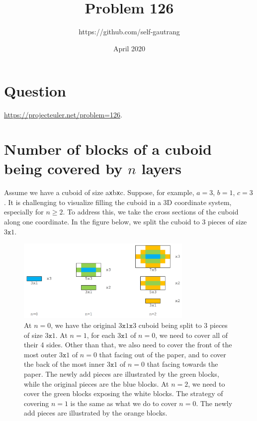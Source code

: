 \documentclass{article}
\title{Problem 126}
\author{https://github.com/self-gautrang}
\date{April 2020}
\begin{document}
\maketitle

\section{Question}
\href{https://projecteuler.net/problem=126}{https://projecteuler.net/problem=126}.

\section{Number of blocks of a cuboid being covered by $n$ layers}
\indent Assume we have a cuboid of size a\texttt{x}b\texttt{x}c. 
Suppose, for example, $a=3$, $b=1$, $c=3$.  
It is challenging to visualize filling the cuboid in a 3D coordinate system, especially for $n \geq 2$. 
To address this, we take the cross sections of the cuboid along one coordinate. 
In the figure below, we split the cuboid to 3 pieces of size $3 \texttt{x} 1$. \\
\begin{figure}[h]
  \centering
    \includegraphics[width=0.75\textwidth]{images/p126_1.png}
  \caption{At $n=0$, we have the original $3\texttt{x}1\texttt{x}3$ cuboid being split to 3 pieces of size $3 \texttt{x} 1$. 
  At $n=1$, for each $3 \texttt{x} 1$ of $n = 0$, we need to cover all of their 4 sides. 
  Other than that, we also need to cover the front of the most outer $3 \texttt{x} 1$ of $n = 0$ that facing out of the paper, and to cover the back of the most inner $3 \texttt{x} 1$ of $n = 0$ that facing towards the paper. 
  The newly add pieces are illustrated by the green blocks, while the original pieces are the blue blocks. 
  At $n=2$, we need to cover the green blocks exposing the white blocks. 
  The strategy of covering $n=1$ is the same as what we do to cover $n=0$. 
  The newly add pieces are illustrated by the orange blocks.}
\end{figure}\\
\end{document}
